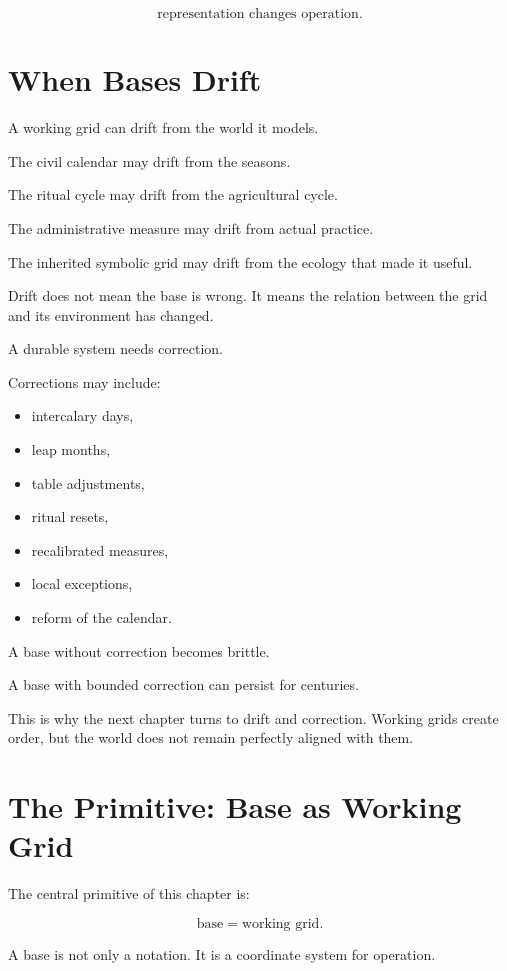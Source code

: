 \documentclass[11pt]{book}
\begin{document}
\[
\text{representation changes operation}.
\]

\section{When Bases Drift}

A working grid can drift from the world it models.

The civil calendar may drift from the seasons.

The ritual cycle may drift from the agricultural cycle.

The administrative measure may drift from actual practice.

The inherited symbolic grid may drift from the ecology that made it useful.

Drift does not mean the base is wrong. It means the relation between the grid and its environment has changed.

A durable system needs correction.

Corrections may include:

\begin{itemize}
    \item intercalary days,
    \item leap months,
    \item table adjustments,
    \item ritual resets,
    \item recalibrated measures,
    \item local exceptions,
    \item reform of the calendar.
\end{itemize}

A base without correction becomes brittle.

A base with bounded correction can persist for centuries.

This is why the next chapter turns to drift and correction. Working grids create order, but the world does not remain perfectly aligned with them.

\section{The Primitive: Base as Working Grid}

The central primitive of this chapter is:

\[
\text{base} = \text{working grid}.
\]

A base is not only a notation. It is a coordinate system for operation.
\end{document}
